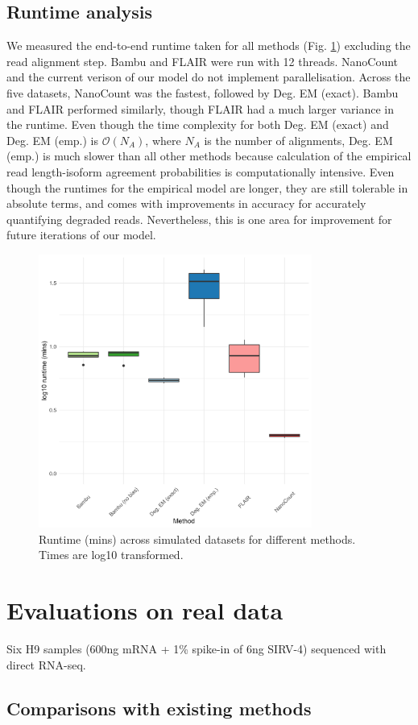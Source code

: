 \newpage

\subsection{Runtime analysis}

We measured the end-to-end runtime taken for all methods (Fig. \ref{fig:runtime}) excluding the read alignment step. Bambu and FLAIR were run with 12 threads. NanoCount and the current verison of our model do not implement parallelisation. Across the five datasets, NanoCount was the fastest, followed by Deg. EM (exact). Bambu and FLAIR performed similarly, though FLAIR had a much larger variance in the runtime. Even though the time complexity for both Deg. EM (exact) and Deg. EM (emp.) is $\mathcal{O}(N_A)$, where $N_A$ is the number of alignments, Deg. EM (emp.) is much slower than all other methods because calculation of the empirical read length-isoform agreement probabilities is computationally intensive. Even though the runtimes for the empirical model are longer, they are still tolerable in absolute terms, and comes with improvements in accuracy for accurately quantifying degraded reads. Nevertheless, this is one area for improvement for future iterations of our model.  

\begin{figure}[H]
    \centering
    \includegraphics[width=0.8\textwidth]{figures/sec-4-runtime.png}
    \caption[Runtime across simulated datasets for different methods]{Runtime (mins) across simulated datasets for different methods. Times are log10 transformed.}
    \label{fig:runtime}
\end{figure}

\section{Evaluations on real data}

Six H9 samples (600ng mRNA + 1\% spike-in of 6ng SIRV-4) sequenced with direct RNA-seq.

\subsection{Comparisons with existing methods}